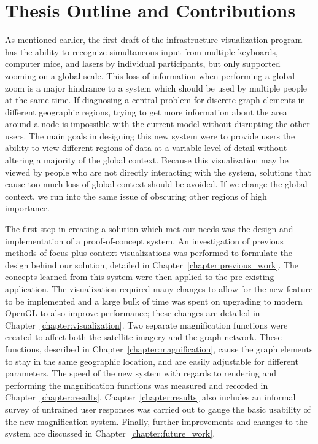 \section{Thesis Outline and Contributions}
\label{section:intro_outline}
As mentioned earlier, the first draft of the infrastructure visualization program has the ability to
recognize simultaneous input from multiple keyboards, computer mice, and lasers by individual participants, but only supported zooming on a global scale. This loss of information when performing a global zoom is a major hindrance to a system which should be used by multiple people at the same time. If diagnosing a central problem for discrete graph elements in different geographic regions, trying to get more information about the area around a node is impossible with the
current model without disrupting the other users. The main goals in designing this new system were to provide users the ability to view different regions of data at a variable level of detail without altering a majority of the
global context. Because this visualization may be viewed by people who are not directly interacting with the system, solutions that cause too much loss of global context should be avoided. If we change the global context, we run into the same issue of obscuring other regions of high importance. 

The first step in creating a solution which met our needs was the design and implementation of a proof-of-concept system. An investigation of previous methods of focus plus context visualizations was performed to formulate the design behind our solution, detailed in Chapter~\ref{chapter:previous_work}. The concepts learned from this system were then applied to the pre-existing application. The visualization required many changes to allow for the new feature to be implemented and a large bulk of time was spent on upgrading to modern OpenGL to also improve performance; these changes are detailed in Chapter~\ref{chapter:visualization}. Two separate magnification functions were created to affect both the satellite imagery and the
graph network. These functions, described in Chapter~\ref{chapter:magnification}, cause the graph elements to stay in the same geographic location, and are easily adjustable for different parameters. The speed of the new system with regards to rendering and performing the magnification functions was measured and recorded in Chapter~\ref{chapter:results}. Chapter~\ref{chapter:results} also includes an informal survey of untrained user responses was carried out to gauge the basic
usability of the new magnification system. Finally, further improvements and changes to the system are discussed in Chapter~\ref{chapter:future_work}.
